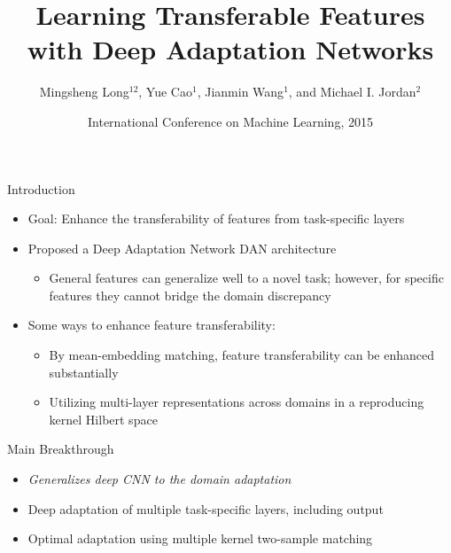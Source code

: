 \documentclass{beamer}
\author[PIN-CHUN, HSU]{ Mingsheng Long$^{12}$, Yue Cao$^1$, Jianmin Wang$^1$, and Michael I. Jordan$^2$ }
\title[Deep Adaptation Networks]{\LARGE Learning Transferable Features with Deep
Adaptation Networks}
\date[May 17, 2017]{International Conference on Machine Learning, 2015}
\begin{document}
\frame{\titlepage}

\begin{frame}[fragile]{Introduction}
\begin{itemize}
\item{Goal: Enhance the transferability of features from task-specific layers}
\item{Proposed a Deep Adaptation Network DAN architecture}
  \begin{itemize}
    \item{General features can generalize well to a novel task; however, for specific features they cannot bridge the domain discrepancy}
  \end{itemize}

\item{Some ways to enhance feature transferability:}
  \begin{itemize}
    \item{By mean-embedding matching, feature transferability can be enhanced substantially}
    \item{Utilizing multi-layer representations across domains in a reproducing kernel Hilbert space}
  \end{itemize}
\end{itemize}
\end{frame}

\begin{frame}[fragile]{Main Breakthrough}
\begin{itemize}
\item{\emph{Generalizes deep CNN to the domain adaptation}}
\item{Deep adaptation of multiple task-specific layers, including output}
\item{Optimal adaptation using multiple kernel two-sample matching}
\end{itemize}
\end{frame}
\end{document}
